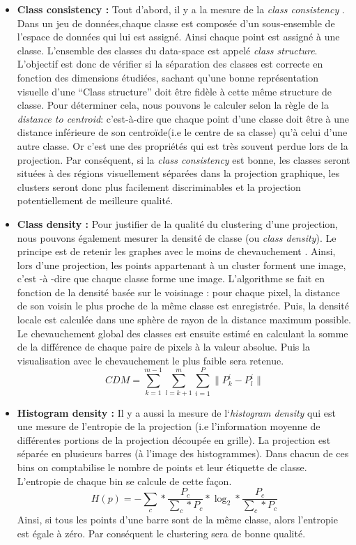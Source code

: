 \begin{itemize}
\item
\textbf{Class consistency : }
\smallskip
Tout d'abord, il y a la mesure de la \textit{class consistency} \cite{bertini2011Class-Consistency}.
 Dans un jeu de données,chaque classe est composée d’un sous-ensemble de l'espace de données qui lui est assigné. Ainsi
chaque point est assigné à une classe. L’ensemble des classes du data-space est appelé
\textit{class structure}.
L'objectif est donc de vérifier si la séparation des classes est correcte en fonction des
dimensions étudiées, sachant qu’une bonne représentation visuelle d’une “Class structure”
doit être fidèle à cette même structure de classe. Pour déterminer cela, nous pouvons le
calculer selon la règle de la \textit{distance to centroid}: c’est-à-dire que
chaque point d’une classe doit être à une distance inférieure de son centroïde(i.e le centre de sa
classe) qu’à celui d’une autre classe.
Or c’est une des propriétés qui est très souvent perdue lors de la projection.
Par conséquent, si la \textit{class consistency} est bonne, les classes seront situées à des régions
visuellement séparées dans la projection graphique, les clusters seront donc plus
facilement discriminables et la projection potentiellement de meilleure qualité.

\item
\textbf{Class density : }
\smallskip
 Pour justifier de la qualité du clustering d’une projection, nous pouvons également
mesurer la densité de classe (ou \textit{class density}).
Le principe est de retenir les graphes avec le moins de chevauchement \cite{AndradaTatu2010visual}.
Ainsi, lors d’une projection, les points appartenant à un cluster forment une image, c'est -à
-dire que chaque classe forme une image.
L’algorithme se fait en fonction de la densité basée sur le voisinage : pour chaque pixel, la
distance de son voisin le plus proche de la même classe est enregistrée. Puis, la densité
locale est calculée dans une sphère de rayon de la distance maximum possible.
Le chevauchement global des classes est ensuite estimé en calculant la somme de la
différence de chaque paire de pixels à la valeur absolue. Puis la visualisation avec le
chevauchement le plus faible sera retenue.
\[CDM =  \sum_{k=1}^{m-1} \sum_{l=k+1}^{m} \sum_{i=1}^{P} \lVert P_{k}^{i} - P_{l}^{i} \rVert \]


\item
\textbf{Histogram density : }
\smallskip
Il y a aussi la mesure de l`\textit{histogram density} \cite{HeulotThese} \cite{AndradaTatu2009combining} qui est une mesure de l’entropie de la projection
(i.e l'information moyenne de différentes portions de la projection découpée en grille). La
projection est séparée en plusieurs barres (à l'image des histogrammes). Dans chacun de
ces bins on comptabilise le nombre de points et leur étiquette de classe. L’entropie de
chaque bin se calcule de cette façon. \[ H(p) = - \sum_{c} * \frac{P_c}{\sum_{c}*P_c} * \log_2 * \frac{P_c}{\sum_c * P_c} \]
Ainsi, si tous les points d’une barre sont de la même classe, alors l’entropie est égale à zéro. Par conséquent le clustering sera de bonne qualité.

\end{itemize}
\smallskip



